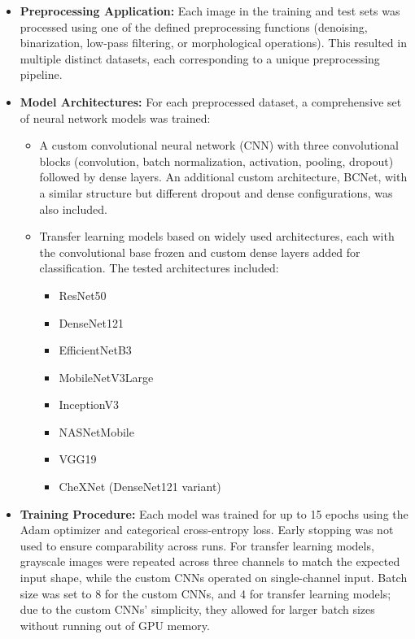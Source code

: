 \documentclass[12pt]{article}
\begin{document}
\begin{itemize}
    \item \textbf{Preprocessing Application:} Each image in the training and test sets was processed using one of the defined preprocessing functions (denoising, binarization, low-pass filtering, or morphological operations). This resulted in multiple distinct datasets, each corresponding to a unique preprocessing pipeline.
    \item \textbf{Model Architectures:} For each preprocessed dataset, a comprehensive set of neural network models was trained:
          \begin{itemize}
              \item A custom convolutional neural network (CNN) with three convolutional blocks (convolution, batch normalization, activation, pooling, dropout) followed by dense layers. An additional custom architecture, BCNet, with a similar structure but different dropout and dense configurations, was also included.
              \item Transfer learning models based on widely used architectures, each with the convolutional base frozen and custom dense layers added for classification. The tested architectures included:
                    \begin{itemize}
                        \item ResNet50
                        \item DenseNet121
                        \item EfficientNetB3
                        \item MobileNetV3Large
                        \item InceptionV3
                        \item NASNetMobile
                        \item VGG19
                        \item CheXNet (DenseNet121 variant)
                    \end{itemize}
          \end{itemize}
    \item \textbf{Training Procedure:} Each model was trained for up to 15 epochs using the Adam optimizer and categorical cross-entropy loss. Early stopping was not used to ensure comparability across runs. For transfer learning models, grayscale images were repeated across three channels to match the expected input shape, while the custom CNNs operated on single-channel input. Batch size was set to 8 for the custom CNNs, and 4 for transfer learning models; due to the custom CNNs' simplicity, they allowed for larger batch sizes without running out of GPU memory.

\end{itemize}
\end{document}
